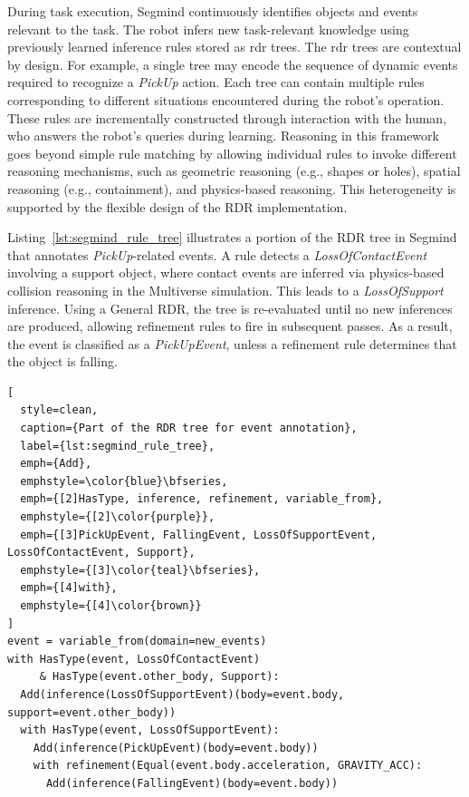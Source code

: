 \documentclass{article}
\begin{document}
During task execution, Segmind continuously identifies objects and events relevant to the task. The robot infers new task-relevant knowledge using previously learned inference rules stored as \ac{rdr} trees. The \ac{rdr} trees are contextual by design. For example, a single tree may encode the sequence of dynamic events required to recognize a \textit{PickUp} action. Each tree can contain multiple rules corresponding to different situations encountered during the robot’s operation. These rules are incrementally constructed through interaction with the human, who answers the robot’s queries during learning. Reasoning in this framework goes beyond simple rule matching by allowing individual rules to invoke different reasoning mechanisms, such as geometric reasoning (e.g., shapes or holes), spatial reasoning (e.g., containment), and physics-based reasoning. This heterogeneity is supported by the flexible design of the RDR implementation.

Listing~\ref{lst:segmind_rule_tree} illustrates a portion of the RDR tree in Segmind that annotates \textit{PickUp}-related events. A rule detects a \textit{LossOfContactEvent} involving a support object, where contact events are inferred via physics-based collision reasoning in the Multiverse simulation. This leads to a \textit{LossOfSupport} inference. Using a General RDR, the tree is re-evaluated until no new inferences are produced, allowing refinement rules to fire in subsequent passes. As a result, the event is classified as a \textit{PickUpEvent}, unless a refinement rule determines that the object is falling.

\begin{lstlisting}[
  style=clean,
  caption={Part of the RDR tree for event annotation},
  label={lst:segmind_rule_tree},
  emph={Add},
  emphstyle=\color{blue}\bfseries,
  emph={[2]HasType, inference, refinement, variable_from},
  emphstyle={[2]\color{purple}},
  emph={[3]PickUpEvent, FallingEvent, LossOfSupportEvent, LossOfContactEvent, Support},
  emphstyle={[3]\color{teal}\bfseries},
  emph={[4]with},
  emphstyle={[4]\color{brown}}
]
event = variable_from(domain=new_events)
with HasType(event, LossOfContactEvent) 
     & HasType(event.other_body, Support):
  Add(inference(LossOfSupportEvent)(body=event.body, support=event.other_body))
  with HasType(event, LossOfSupportEvent):
    Add(inference(PickUpEvent)(body=event.body))
    with refinement(Equal(event.body.acceleration, GRAVITY_ACC):
      Add(inference(FallingEvent)(body=event.body))
\end{lstlisting}
\end{document}
